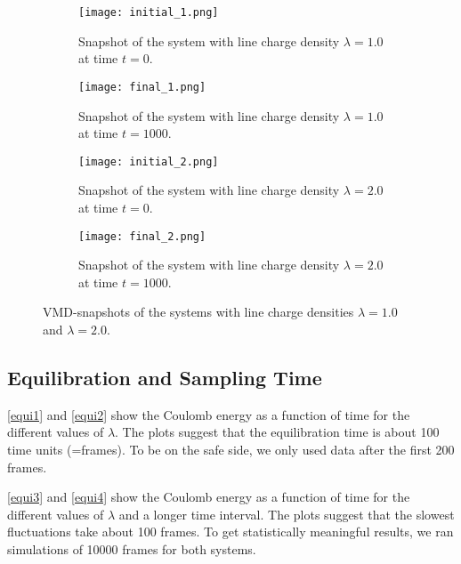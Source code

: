 \documentclass[a4paper,10pt,bibtotoc]{scrartcl}
\begin{document}
\begin{figure}[H]
\begin{subfigure}{.5\textwidth}
  \centering
  \texttt{[image: initial\_1.png]}  
  \caption{Snapshot of the system with line charge density $\lambda=1.0$ at time $t=0$.}
\end{subfigure}
\begin{subfigure}{.5\textwidth}
  \centering
  \texttt{[image: final\_1.png]}  
  \caption{Snapshot of the system with line charge density $\lambda=1.0$ at time $t=1000$.}
\end{subfigure}
\begin{subfigure}{.5\textwidth}
  \centering
  \texttt{[image: initial\_2.png]}  
  \caption{Snapshot of the system with line charge density $\lambda=2.0$ at time $t=0$.}
\end{subfigure}
\begin{subfigure}{.5\textwidth}
  \centering
  \texttt{[image: final\_2.png]}  
  \caption{Snapshot of the system with line charge density $\lambda=2.0$ at time $t=1000$.}
\end{subfigure}
\caption{VMD-snapshots of the systems with line charge densities $\lambda=1.0$ and $\lambda=2.0$.}
\label{fig:VMD}
\end{figure}

\subsection{Equilibration and Sampling Time}
\autoref{equi1} and \autoref{equi2} show the Coulomb energy as a function of time for the different values of $\lambda$. The plots suggest that the equilibration time is about 100 time units (=frames). To be on the safe side, we only used data after the first 200 frames.

\autoref{equi3} and \autoref{equi4} show the Coulomb energy as a function of time for the different values of $\lambda$ and a longer time interval.
The plots suggest that the slowest fluctuations take about 100 frames.
To get statistically meaningful results, we ran simulations of 10000 frames for both systems.
\end{document}

